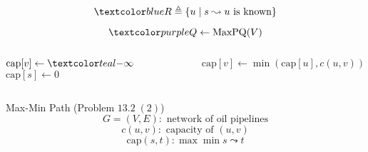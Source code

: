 \begin{frame}{}
  \[
    \blue{R \triangleq \set{u \mid s \leadsto u \text{ is known}}}
  \]

  \pause
  \[
    \purple{Q \gets \text{MaxPQ}(V)}
  \]

  \pause
  \vspace{0.50cm}
  \begin{columns}
      \begin{algorithmic}
	  \State $\text{cap}[v] \gets \teal{-\infty}$
	\EndFor
	\State $\text{cap}[s] \gets 0$
      \end{algorithmic}
      \begin{algorithmic}
	  \State $\text{cap}[v] \gets \min(\text{cap}[u], c(u,v))$
	\EndIf
      \end{algorithmic}
  \end{columns}
\end{frame}

\begin{frame}{}
  \begin{exampleblock}{Max-Min Path (Problem $13.2\; (2)$)}
    \[
      G = (V, E): \text{ network of oil pipelines}
    \]
    \[
      c(u,v): \text{ capacity of } (u,v)
    \]
    \[
      \text{cap}(s,t): \max \min s \leadsto t
    \]
      
    \vspace{0.30cm}
    \centerline{}
  \end{exampleblock}

  \pause
  \vspace{0.30cm}
\end{frame}
